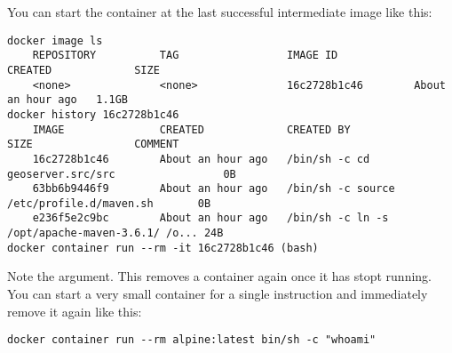 You can start the container at the last successful intermediate image like this: 

\begin{lstlisting}
docker image ls 
    REPOSITORY          TAG                 IMAGE ID            CREATED             SIZE
    <none>              <none>              16c2728b1c46        About an hour ago   1.1GB
docker history 16c2728b1c46
    IMAGE               CREATED             CREATED BY                                      SIZE                COMMENT
    16c2728b1c46        About an hour ago   /bin/sh -c cd geoserver.src/src                 0B
    63bb6b9446f9        About an hour ago   /bin/sh -c source /etc/profile.d/maven.sh       0B
    e236f5e2c9bc        About an hour ago   /bin/sh -c ln -s /opt/apache-maven-3.6.1/ /o... 24B
docker container run --rm -it 16c2728b1c46 (bash)
\end{lstlisting}

Note the  argument. This removes a container again once it has stopt running. You can start a very small container for a single instruction and immediately remove it again like this: 

\begin{lstlisting}
docker container run --rm alpine:latest bin/sh -c "whoami"
\end{lstlisting}




